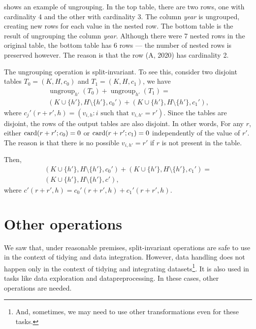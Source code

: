  shows an example of ungrouping.  In the top table, there are two rows,
one with cardinality 4 and the other with cardinality 3.  The column \emph{year} is
ungrouped, creating new rows for each value in the nested row.  The bottom table is the
result of ungrouping the column \emph{year}.  Although there were 7 nested rows in the
original table, the bottom table has 6 rows --- the number of nested rows is preserved
however.  The reason is that the row (A, 2020) has cardinality 2.

The ungrouping operation is split-invariant.  To see this, consider two disjoint tables
$T_0 = (K, H, c_0)$ and $T_1 = (K, H, c_1)$, we have
\begin{multline*}
  \operatorname{ungroup}_{h'}(T_0) + \operatorname{ungroup}_{h'}(T_1) = \\
    \left(K \cup \{h'\}, H \setminus \{h'\}, c_0'\right) +
    \left(K \cup \{h'\}, H \setminus \{h'\}, c_1'\right)\text{,}
\end{multline*}
where $c_j'(r + r', h) = (v_{i,h} : i \text{ such that } v_{i, h'} = r')$. Since the
tables are disjoint, the rows of the output tables are also disjoint.  In other words,
For any $r$, either $\rowcard[{r + r'; c_0}] = 0$ or $\rowcard[{r + r'; c_1}] = 0$
independently of the value of $r'$.  The reason is that there is no possible $v_{i,h'} =
r'$ if $r$ is not present in the table.

Then,
\begin{multline*}
  \left(K \cup \{h'\}, H \setminus \{h'\}, c_0'\right) +
  \left(K \cup \{h'\}, H \setminus \{h'\}, c_1'\right) = \\
    \left(K \cup \{h'\}, H \setminus \{h'\}, c'\right)\text{,}
\end{multline*}
where $c'(r + r', h) = c_0'(r + r', h) + c_1'(r + r', h)$.

\section{Other operations}

We saw that, under reasonable premises, split-invariant operations are safe to use in the
context of tidying and data integration.  However, data handling does not happen only in
the context of tidying and integrating datasets\footnote{And, sometimes, we may need to
use other transformations even for these tasks.}.  It is also used in tasks like data
exploration and \gls{datapreprocessing}.  In these cases, other operations are needed.

